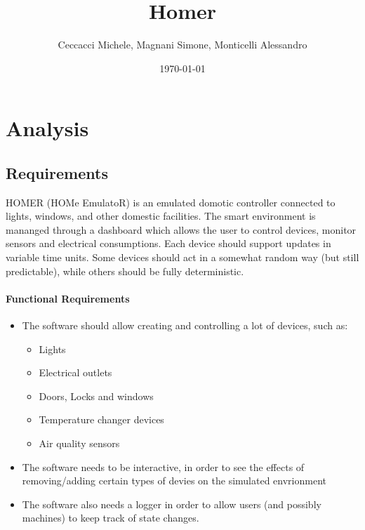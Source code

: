 \documentclass[a4paper,12pt]{report}
\title{Homer}
\author{Ceccacci Michele, Magnani Simone, Monticelli Alessandro}
\date{\today}
\begin{document}
\maketitle

\begin{abstract}
\end{abstract}

\tableofcontents

\chapter{Analysis}
\section{Requirements}

HOMER (HOMe EmulatoR) is an emulated domotic controller connected to lights, windows, and other domestic facilities.
The smart environment is mananged through a dashboard which allows the user to control devices, monitor sensors and electrical consumptions.
Each device should support updates in variable time units.
Some devices should act in a somewhat random way (but still predictable), while others should be fully deterministic.

\subsubsection{Functional Requirements}

\begin{itemize}
	\item The software should allow creating and controlling a lot of devices, such as:
	\begin{itemize}
		\item Lights
		\item Electrical outlets
		\item Doors, Locks and windows
		\item Temperature changer devices
		\item Air quality sensors
	\end{itemize}
	\item The software needs to be interactive, in order to see the effects of removing/adding certain types of devies on the simulated envrionment
	\item The software also needs a logger in order to allow users (and possibly machines) to keep track of state changes.
\end{itemize}
\end{document}
